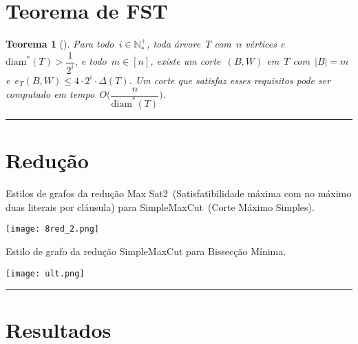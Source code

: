 \documentclass[a0,portrait]{a0poster}
\newtheorem{teo}{Teorema}
\newcommand{\diam}{\mathrm{diam}}
\begin{document}
\begin{multicols}{3}
\section*{Teorema de FST}

\begin{teo}[]
\label{teo:corteExato}
    Para todo~${i\in \mathbb{N^+_*}}$, toda árvore~$T$ com~$n$
    vértices e~${\diam^*(T)>\dfrac{1}{2^i}}$, e todo~${m\in[n]}$,
    existe um corte~$(B,W)$ em~$T$ com~${|B|=m}$ 
    e~$e_T(B,W)\le 4\cdot 2^i\cdot \Delta(T)$.
    Um corte que satisfaz esses requisitos pode ser computado
    em tempo~${O\Big(\dfrac{n}{\diam^*(T)}\Big)}$.
\end{teo}

\noindent\rule[0.5ex]{\linewidth}{1pt}


\section*{Redução}

    Estilos de grafos da redução Max Sat2~(Satisfatibilidade
    máxima 
    com no máximo duas literais por cláusula) para
    SimpleMaxCut~(Corte Máximo Simples).
\begin{center}
\texttt{[image: 8red\_2.png]}
\end{center}

Estilo de grafo da redução SimpleMaxCut para Bissecção Mínima.
    
\begin{center}
\texttt{[image: ult.png]}
\end{center}
\noindent\rule[0.5ex]{\linewidth}{1pt}

\section*{Resultados}

\end{multicols}
\end{document}
